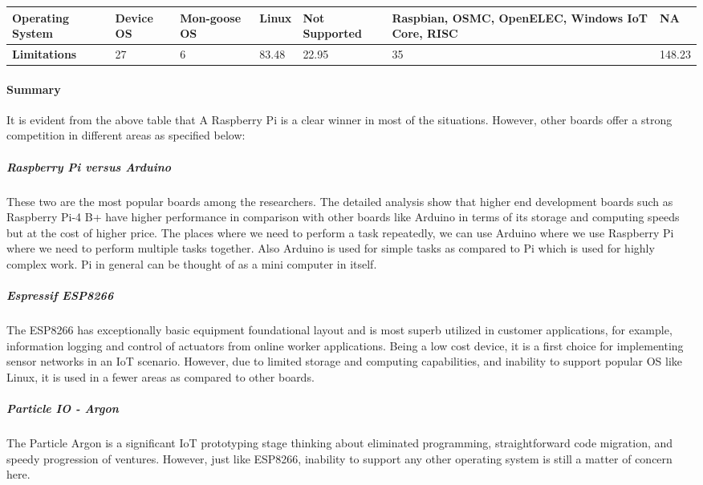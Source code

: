 \documentclass[a4paper,11pt]{article}
\begin{document}
\begin{iotsolution}
\begin{center}
\begin{longtable}{|p{2.2cm}|p{1.5cm}|p{1.5cm}|p{2.2cm}|p{2cm}|p{2cm}|p{2cm}|}
   \textbf{Operating System} & Device OS & Mon-goose OS & Linux  & Not Supported & Raspbian, OSMC, OpenELEC, Windows IoT Core, RISC & NA\\
 \hline
\textbf{Limitations} & 27 & 6 & 83.48 & 22.95 & 35 & 148.23\\
 \hline
 
\end{longtable}

\end{center}


\vspace{20}
\paragraph{\large{Summary}} It is evident from the above table that A Raspberry Pi is a clear winner in most of the situations. However, other boards offer a strong competition in different areas as specified below:

\subparagraph{Raspberry Pi versus Arduino} 
These two are the most popular boards among the researchers. The  detailed  
analysis  show  that  higher  end  development  boards  such  as  
Raspberry Pi-4 B+ have higher performance in comparison with 
other  boards  like  Arduino in  terms  of  its  
storage and computing speeds but at the cost of higher price. The places where we need to perform a task repeatedly, we can use Arduino where we use Raspberry Pi where we need to perform multiple tasks together. Also Arduino is used for simple tasks as compared to Pi which is used for highly complex work. Pi in general can be thought of as a mini computer in itself.

\subparagraph{Espressif ESP8266}The ESP8266 has
exceptionally basic equipment foundational layout and is
most superb utilized in customer applications, for example,
information logging and control of actuators from online
worker applications. Being  a  low  cost  device, it  is  a  first  choice  for  implementing 
sensor networks in an IoT scenario. However, due to limited storage and computing capabilities, and inability to support popular OS like Linux, it is used in a fewer areas as compared to other boards. 

\subparagraph{Particle IO - Argon}The Particle Argon is a significant IoT prototyping stage thinking about eliminated programming, straightforward code migration, and speedy progression of ventures. However, just like ESP8266, inability to support any other operating system is still a matter of concern here.


\end{iotsolution}
\end{document}
